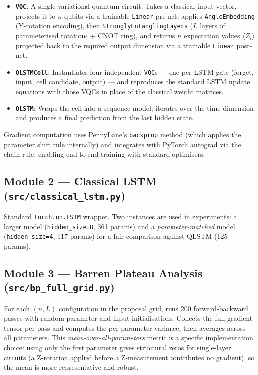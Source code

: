 \documentclass[10pt,twocolumn]{article}
\begin{document}
\begin{itemize}
  \item \textbf{\texttt{VQC}}: A single variational quantum circuit. Takes a classical input vector, projects it to $n$ qubits via a trainable \texttt{Linear} pre-net, applies \texttt{AngleEmbedding} (Y-rotation encoding), then \texttt{StronglyEntanglingLayers} ($L$ layers of parameterised rotations + CNOT ring), and returns $n$ expectation values $\langle Z_i \rangle$ projected back to the required output dimension via a trainable \texttt{Linear} post-net.
  \item \textbf{\texttt{QLSTMCell}}: Instantiates four independent \texttt{VQC}s — one per LSTM gate (forget, input, cell candidate, output) — and reproduces the standard LSTM update equations with those VQCs in place of the classical weight matrices.
  \item \textbf{\texttt{QLSTM}}: Wraps the cell into a sequence model; iterates over the time dimension and produces a final prediction from the last hidden state.
\end{itemize}

Gradient computation uses PennyLane's \texttt{backprop} method (which applies the parameter shift rule internally) and integrates with PyTorch autograd via the chain rule, enabling end-to-end training with standard optimisers.

\subsection*{Module 2 — Classical LSTM (\texttt{src/classical\_lstm.py})}

Standard \texttt{torch.nn.LSTM} wrapper. Two instances are used in experiments: a larger model (\texttt{hidden\_size=8}, 361 params) and a \emph{parameter-matched} model (\texttt{hidden\_size=4}, 117 params) for a fair comparison against QLSTM (125 params).

\subsection*{Module 3 — Barren Plateau Analysis (\texttt{src/bp\_full\_grid.py})}

For each $(n, L)$ configuration in the proposal grid, runs 200 forward-backward passes with random parameter and input initialisations. Collects the full gradient tensor per pass and computes the per-parameter variance, then averages across all parameters. This \emph{mean-over-all-parameters} metric is a specific implementation choice: using only the first parameter gives structural zeros for single-layer circuits (a Z-rotation applied before a Z-measurement contributes no gradient), so the mean is more representative and robust.
\end{document}
